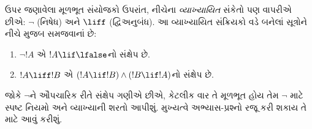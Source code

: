 \documentclass[../../../include/open-logic-section]{subfiles}
\begin{document}
ઉપર જણાવેલા મૂળભૂત સંયોજકો ઉપરાંત, નીચેના \emph{વ્યાખ્યાયિત}
સંકેતો પણ વાપરીએ છીએ: $\lnot$ (નિષેધ) અને $\liff$
(દ્વિઅનુબંધ). આ વ્યાખ્યાયિત સંક્રિયકો વડે બનેલાં
સૂત્રોને નીચે મુજબ સમજવાનાં છે:
\begin{enumerate}
\item $\lnot !A$ એ $!A \lif \lfalse$નો સંક્ષેપ છે.

\item $!A \liff !B$ એ $(!A \lif !B) \land (!B
  \lif !A)$નો સંક્ષેપ છે.
\end{enumerate}

જોકે $\lnot$ને ઔપચારિક રીતે સંક્ષેપ ગણીએ છીએ, કેટલીક વાર
તે મૂળભૂત હોય તેમ $\lnot$ માટે સ્પષ્ટ નિયમો અને વ્યાખ્યાની
શરતો આપીશું. મુખ્યત્વે અભ્યાસ-પ્રશ્નો રજૂ કરી શકાય તે માટે
આવું કરીશું.
\end{document}
